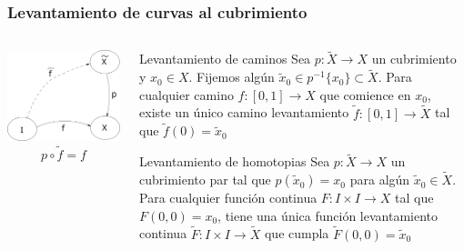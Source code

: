 \documentclass[xetex,mathserif,serif]{beamer}
\begin{document}
  \begin{frame}
    \frametitle{Levantamiento de curvas al cubrimiento}
    \begin{columns}
      \begin{column}{.4\textwidth}
        \centering
        \includegraphics[scale=0.3]{../tesis/imagenes/lifting-path.png}
        \[ p \circ \tilde f = f \]
      \end{column}
    \begin{column}{.6\textwidth}

      \begin{block}{Levantamiento de caminos}
        Sea \(p : \tilde X \to X\) un cubrimiento y \(x_0 \in X\).
        Fijemos algún \(\tilde x _0 \in p^{-1} \{x_0\} \subset \tilde
        X\). Para cualquier camino \(f : [0,1] \to X\) que comience en \(x_0\),
        existe un único camino levantamiento \(\tilde f : [0,1] \to \tilde X\)
        tal que \(\tilde f (0) = \tilde x _0\)
      \end{block}

      \pause

      \begin{block}{Levantamiento de homotopias}
        Sea \(p : \tilde X \to X\) un cubrimiento par tal que \(p(\tilde
        x _0) = x_0 \) para algún \(\tilde x _0 \in \tilde X\). Para cualquier
        función continua \(F : I \times I \to X\) tal que \(F(0,0) = x_0\),
        tiene una única función levantamiento continua \(\tilde F : I \times I
        \to \tilde X\) que cumpla \(\tilde F (0,0) = \tilde x_0\)
      \end{block}
    \end{column}
    \end{columns}
  \end{frame}
\end{document}
